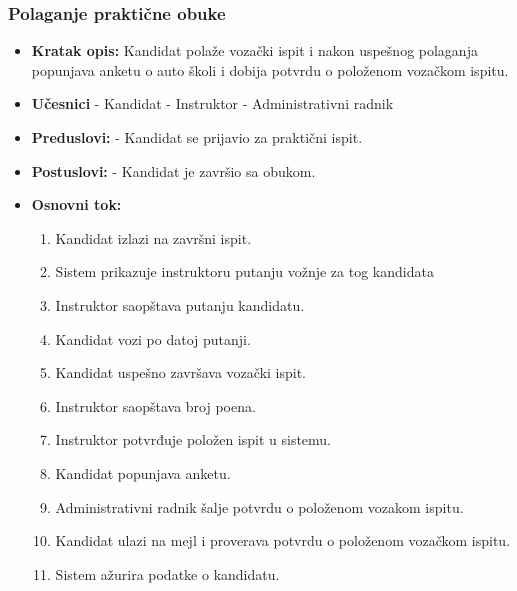 \subsubsection{Polaganje praktične obuke}

\vspace{3mm}

\begin{itemize}

\item \textbf{Kratak opis:} Kandidat polaže vozački ispit i nakon uspešnog polaganja popunjava anketu o auto školi i dobija potvrdu o položenom vozačkom ispitu.

\vspace{2mm}

\item \textbf{Učesnici} \newline
   - Kandidat \newline   
   - Instruktor \newline
   - Administrativni radnik 
   
\item \textbf{Preduslovi:} \newline
   - Kandidat se prijavio za praktični ispit.

\item \textbf{Postuslovi:} \newline
    - Kandidat je završio sa obukom.

\item \textbf{Osnovni tok:}  
   \begin{enumerate}
   \item Kandidat izlazi na završni ispit.
   \item Sistem prikazuje instruktoru putanju vožnje za tog kandidata
   \item Instruktor saopštava putanju kandidatu.
   \item Kandidat vozi po datoj putanji.
   \item Kandidat uspešno završava vozački ispit.
   \item Instruktor saopštava broj poena.
   \item Instruktor potvrđuje položen ispit u sistemu.
   \item Kandidat popunjava anketu.
   \item Administrativni radnik šalje potvrdu o položenom vozakom ispitu.
   \item Kandidat ulazi na mejl i proverava potvrdu o položenom vozačkom ispitu.
   \item Sistem ažurira podatke o kandidatu.     


\end{enumerate}
\end{itemize}
